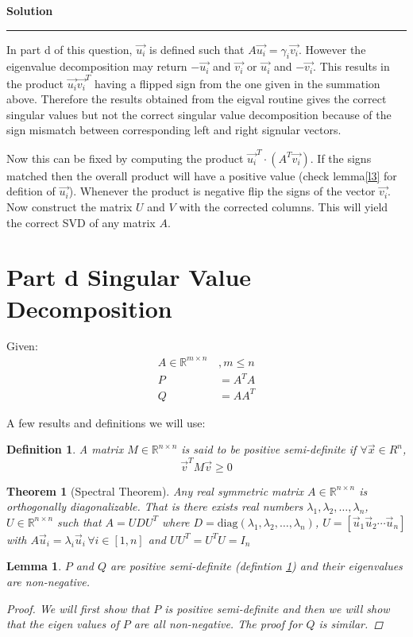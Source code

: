 \documentclass[a4paper,12pt]{article}
\newenvironment{solution}[2][]{%
    \begin{mdframed}[linecolor=blue!70!black, linewidth=2pt, roundcorner=10pt, backgroundcolor=yellow!10!white, skipabove=12pt, skipbelow=12pt]%
        \textbf{\large #2}
        \par\noindent\rule{\textwidth}{0.4pt}
}{
    \end{mdframed}
}
\newtheorem{Def}{Definition}
\newtheorem{lemma}{Lemma}
\newtheorem{theorem}{Theorem}
\begin{document}
\begin{solution}{Solution}
        In part d of this question, $\vec{u_{i}}$ is defined such that $A\vec{u_{i}} = \gamma_{i} \vec{v_{i}}$. However the eigenvalue
        decomposition may return $-\vec{u_{i}}$ and $\vec{v_{i}}$ or $\vec{u_{i}}$ and $-\vec{v_{i}}$. This results in the product 
        $\vec{u_{i}}\vec{v_{i}}^{T}$ having a flipped sign from the one given in the summation above. Therefore the results obtained
        from the eigval routine gives the correct singular values but not the correct singular value decomposition because of the sign
        mismatch between corresponding left and right signular vectors.

        Now this can be fixed by computing the product  $\vec{u_{i}}^{T} \cdot (A^{T}\vec{v_{i}})$. If the signs matched then the overall
        product will have a positive value (check lemma\@\ref{l3} for defition of $\vec{u_{i}}$). Whenever the product 
        is negative flip the signs of the vector $\vec{v_{i}}$. Now construct the matrix $U$ and $V$ with the corrected columns.
        This will yield the correct SVD of any matrix $A$.
        
      \section*{Part d Singular Value Decomposition}

      Given:
      \begin{align*}
        A \in \mathbb{R}^{m \times n} \, &, m \leqslant n \\
        P &= A^{T}A \\
        Q &= AA^{T}
      \end{align*}

      A few results and definitions we will use:
      \begin{Def}\label{psd}
         A matrix $M \in \mathbb{R}^{n \times n}$ is said to be positive semi-definite if $\forall \vec{x} \in R^{n}$,
         \[ \vec{v}^{T} M \vec{v} \geqslant 0\]
      \end{Def}
      \begin{theorem}[Spectral Theorem]\label{spectral}
        Any real symmetric matrix $A \in \mathbb{R}^{n \times n}$ is orthogonally diagonalizable. That is there exists real numbers
        $\lambda_{1},\lambda_{2}, \dots,\lambda_{n}$, $U \in \mathbb{R}^{n \times n}$ such that $A = UDU^{T}$ where 
        $D = \text{diag}(\lambda_{1},\lambda_{2},\dots,\lambda_{n})$,
        $U = \left[ \vec{u}_{1} \vec{u}_{2} \cdots \vec{u}_{n}\right]$ with 
        $A \vec{u}_{i} = \lambda_{i} \vec{u}_{i} \, \forall i \in [1,n]$ and $UU^{T} = U^{T}U = I_{n}$
      \end{theorem}
        \begin{lemma}\label{l1}
        $P$ and $Q$ are positive semi-definite (defintion \@\ref{psd}) and their eigenvalues are non-negative.
          \begin{proof}
            We will first show that $P$ is positive semi-definite and then we will show that the eigen values of $P$ 
            are all non-negative. The proof for $Q$ is similar.     
            

\end{proof}
\end{lemma}
\end{solution}
\end{document}
